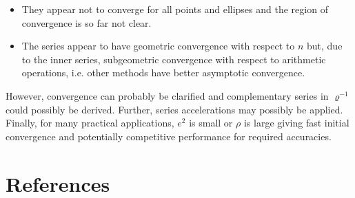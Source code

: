 \documentclass[a4paper]{amsart}
\begin{document}
\begin{itemize}
\item They appear not to converge for all points and ellipses and the region of convergence is so far not clear.
\item The series appear to have geometric convergence with respect to $n$ but, due to the inner series, subgeometric convergence with respect to arithmetic operations, i.e. other methods have better asymptotic convergence. %
\end{itemize}
However, convergence can probably be clarified and complementary series in $\varrho^{-1}$ could possibly be derived.
Further, series accelerations may possibly be applied.
Finally, for many practical applications, $e^2$ is small or $\rho$ is large giving fast initial convergence and potentially competitive performance for required accuracies.



\section*{References}
\printbibliography[heading=none]

\appendix
\newrefsegment %
\end{document}
